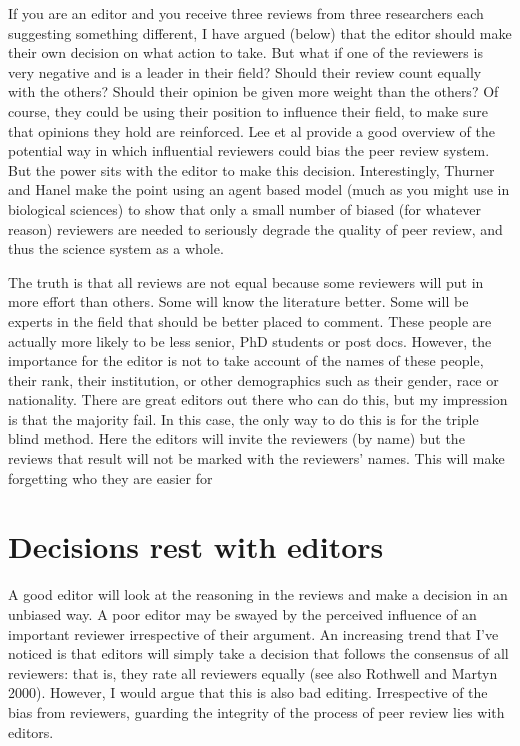 \documentclass[
]{krantz}
\begin{document}
If you are an editor and you receive three reviews from three researchers each suggesting something different, I have argued (below) that the editor should make their own decision on what action to take. But what if one of the reviewers is very negative and is a leader in their field? Should their review count equally with the others? Should their opinion be given more weight than the others? Of course, they could be using their position to influence their field, to make sure that opinions they hold are reinforced. Lee et al \citeyearpar{lee2013bias} provide a good overview of the potential way in which influential reviewers could bias the peer review system. But the power sits with the editor to make this decision. Interestingly, Thurner and Hanel \citeyearpar{thurner2011peer} make the point using an agent based model (much as you might use in biological sciences) to show that only a small number of biased (for whatever reason) reviewers are needed to seriously degrade the quality of peer review, and thus the science system as a whole.

The truth is that all reviews are not equal because some reviewers will put in more effort than others. Some will know the literature better. Some will be experts in the field that should be better placed to comment. These people are actually more likely to be less senior, PhD students or post docs. However, the importance for the editor is not to take account of the names of these people, their rank, their institution, or other demographics such as their gender, race or nationality. There are great editors out there who can do this, but my impression is that the majority fail. In this case, the only way to do this is for the triple blind method. Here the editors will invite the reviewers (by name) but the reviews that result will not be marked with the reviewers' names. This will make forgetting who they are easier for

\hypertarget{decisions-rest-with-editors}{%
\section{Decisions rest with editors}\label{decisions-rest-with-editors}}

A good editor will look at the reasoning in the reviews and make a decision in an unbiased way. A poor editor may be swayed by the perceived influence of an important reviewer irrespective of their argument. An increasing trend that I've noticed is that editors will simply take a decision that follows the consensus of all reviewers: that is, they rate all reviewers equally (see also Rothwell and Martyn 2000). However, I would argue that this is also bad editing. Irrespective of the bias from reviewers, guarding the integrity of the process of peer review lies with editors.
\end{document}
